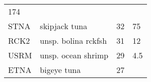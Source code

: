 \documentclass[]{article}
\begin{document}
\begin{longtable}[c]{@{}llll@{}}
\begin{minipage}[t]{0.23\columnwidth}
174
\end{minipage}
\\\addlinespace
\begin{minipage}[t]{0.08\columnwidth}\raggedright
STNA
\end{minipage} & \begin{minipage}[t]{0.36\columnwidth}\raggedright
skipjack tuna
\end{minipage} & \begin{minipage}[t]{0.21\columnwidth}\raggedright
32
\end{minipage} & \begin{minipage}[t]{0.23\columnwidth}\raggedright
75
\end{minipage}
\\\addlinespace
\begin{minipage}[t]{0.08\columnwidth}\raggedright
RCK2
\end{minipage} & \begin{minipage}[t]{0.36\columnwidth}\raggedright
unsp. bolina rckfsh
\end{minipage} & \begin{minipage}[t]{0.21\columnwidth}\raggedright
31
\end{minipage} & \begin{minipage}[t]{0.23\columnwidth}\raggedright
12
\end{minipage}
\\\addlinespace
\begin{minipage}[t]{0.08\columnwidth}\raggedright
USRM
\end{minipage} & \begin{minipage}[t]{0.36\columnwidth}\raggedright
unsp. ocean shrimp
\end{minipage} & \begin{minipage}[t]{0.21\columnwidth}\raggedright
29
\end{minipage} & \begin{minipage}[t]{0.23\columnwidth}\raggedright
4.5
\end{minipage}
\\\addlinespace
\begin{minipage}[t]{0.08\columnwidth}\raggedright
ETNA
\end{minipage} & \begin{minipage}[t]{0.36\columnwidth}\raggedright
bigeye tuna
\end{minipage} & \begin{minipage}[t]{0.21\columnwidth}\raggedright
27
\end{minipage} & \begin{minipage}[t]{0.23\columnwidth}\raggedright

\end{minipage}
\end{longtable}
\end{document}
